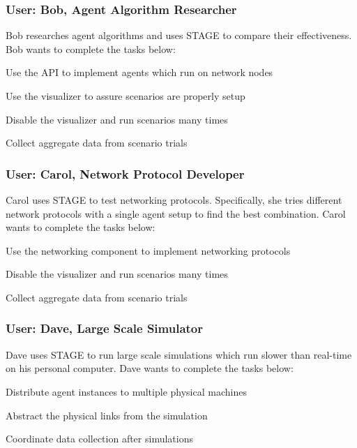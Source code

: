 \documentclass[titlepage]{article}
\begin{document}
\subsubsection{User: Bob, Agent Algorithm Researcher%
  \label{bob}%
}

Bob researches agent algorithms and uses STAGE to compare their effectiveness.  Bob wants to complete the tasks below:

\begin{itemize*}
    \item Use the API to implement agents which run on network nodes
    \item Use the visualizer to assure scenarios are properly setup
    \item Disable the visualizer and run scenarios many times
    \item Collect aggregate data from scenario trials
\end{itemize*}

\subsubsection{User: Carol, Network Protocol Developer%
  \label{bob}%
}

Carol uses STAGE to test networking protocols.  Specifically, she tries different network protocols with a single agent
setup to find the best combination.  Carol wants to complete the tasks below:

\begin{itemize*}
    \item Use the networking component to implement networking protocols
    \item Disable the visualizer and run scenarios many times
    \item Collect aggregate data from scenario trials
\end{itemize*}

\subsubsection{User: Dave, Large Scale Simulator%
  \label{bob}%
}

Dave uses STAGE to run large scale simulations which run slower than real-time on his personal computer.  Dave wants to
complete the tasks below:

\begin{itemize*}
    \item Distribute agent instances to multiple physical machines
    \item Abstract the physical links from the simulation
    \item Coordinate data collection after simulations
\end{itemize*}
\end{document}

